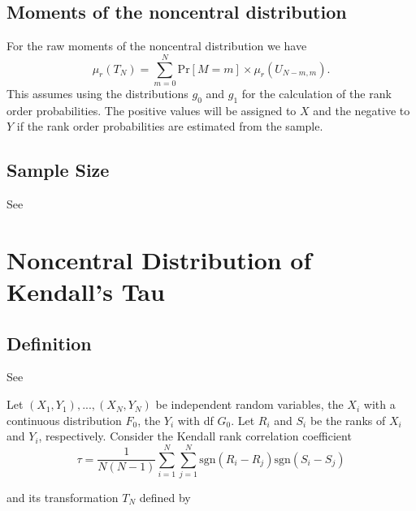 \subsection{Moments of the noncentral distribution}
For the raw moments of the noncentral distribution we have
\begin{equation} 
	\mu_r(T_N) = \sum_{m=0}^N \text{Pr}[M=m] \times \mu_r(U_{N-m,m}).
\end{equation}
This assumes using the distributions $g_0$ and $g_1$ for the calculation of the rank order probabilities. The positive values will be assigned to $X$ and the negative to $Y$ if the rank order probabilities are estimated from the sample.




\subsection{Sample Size}

See \cite{noether_sample_1987}

%





\newpage
\section{Noncentral Distribution of Kendall's Tau}


\subsection{Definition}
\label{KendallTauDistributionDefinition}

See \cite{Wang_2003_Rank}

Let $(X_1, Y_1),...,(X_N, Y_N)$ be independent random variables, the $X_i$ with a continuous distribution $F_0$, the $Y_i$ with df $G_0$. Let $R_i$ and $S_i$ be the ranks of $X_i$ and $Y_i$, respectively.
Consider the Kendall rank correlation coefficient
\begin{equation} 
	\tau = \frac{1}{N(N-1)} \sum_{i=1}^N \sum_{j=1}^N \text{sgn}(R_i - R_j)  \text{sgn}(S_i - S_j)
\end{equation}

and its transformation $T_N$ defined by

